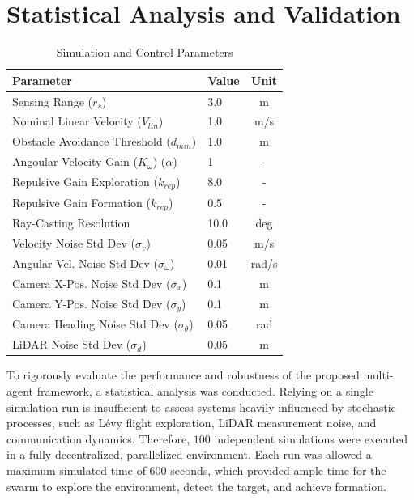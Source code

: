 \documentclass[times, twoside]{zHenriquesLab-StyleBioRxiv}
\begin{document}
\section*{Statistical Analysis and Validation}
\begin{table}[htbp]
    \centering
    \renewcommand{\arraystretch}{1.2} 
    \begin{tabular}{@{}llc@{}}
        \toprule
        \textbf{Parameter} & \textbf{Value} & \textbf{Unit} \\
        \midrule
        Sensing Range ($r_s$) & 3.0 & m \\
        Nominal Linear Velocity ($V_{lin}$) & 1.0 & m/s \\
        Obstacle Avoidance Threshold ($d_{min}$) & 1.0 & m \\
        Angoular Velocity Gain ($K_\omega$) ($\alpha$) & 1 & - \\
        Repulsive Gain Exploration ($k_{rep}$) & 8.0 & - \\
        Repulsive Gain Formation ($k_{rep}$) & 0.5 & - \\
        Ray-Casting Resolution & 10.0 & deg \\
        Velocity Noise Std Dev ($\sigma_v$) & 0.05 & m/s \\
        Angular Vel. Noise Std Dev ($\sigma_\omega$) & 0.01 & rad/s \\
        Camera X-Pos. Noise Std Dev ($\sigma_x$) & 0.1 & m \\
        Camera Y-Pos. Noise Std Dev ($\sigma_y$) & 0.1 & m \\
        Camera Heading Noise Std Dev ($\sigma_\theta$) & 0.05 & rad \\
        LiDAR Noise Std Dev ($\sigma_d$) & 0.05 & m \\
        \bottomrule
    \end{tabular}
    \caption{Simulation and Control Parameters}
    \label{tab:sim_parameters}
\end{table}


To rigorously evaluate the performance and robustness of the proposed multi-agent framework, a statistical analysis was conducted. Relying on a single simulation run is insufficient to assess systems heavily influenced by stochastic processes, such as Lévy flight exploration, LiDAR measurement noise, and communication dynamics. Therefore, $100$ independent simulations were executed in a fully decentralized, parallelized environment. Each run was allowed a maximum simulated time of $600$ seconds, which provided ample time for the swarm to explore the environment, detect the target, and achieve formation.
\end{document}
